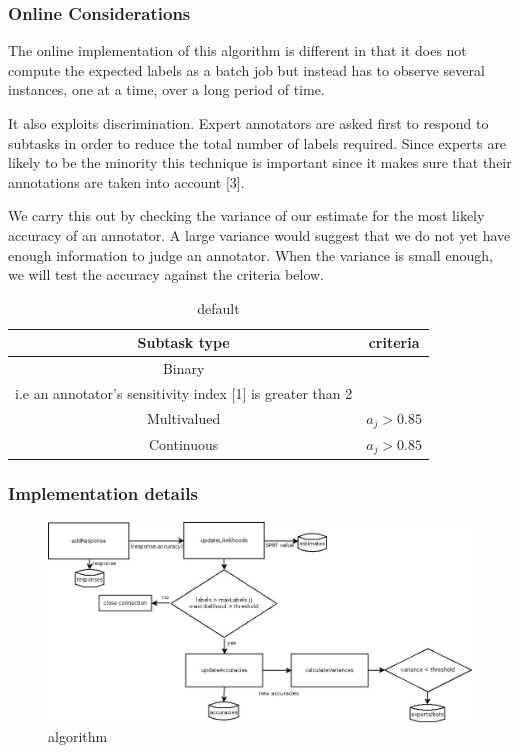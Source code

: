 \documentclass[11pt]{article}
\begin{document}
\subsubsection{Online Considerations}

The online implementation of this algorithm is different in that it does not compute the expected labels as a batch job but instead has to observe several instances, one at a time, over a long period of time.

It also exploits discrimination. Expert annotators are asked first to respond to subtasks in order to reduce the total number of labels required. Since experts are likely to be the minority this technique is important since it makes sure that their annotations are taken into account [3].

We carry this out by checking the variance of our estimate for the most likely accuracy of an annotator. A large variance would suggest that we do not yet have enough information to judge an annotator. When the variance is small enough, we will test the accuracy against the criteria below.\\

\begin{table}[htdp]
\caption{default}
\begin{center}
\begin{tabular}{|c|c|}
Subtask type & criteria\\ \hline
Binary & \shortstack{$\frac{\Phi^{-1}(a_{j}^{0}) - \Phi^{-1}(1 - a_{j}^{1})}{2} > 2$ \\ i.e an annotator's sensitivity index [1] is greater than 2}\\
Multivalued & $a_{j} > 0.85$\\ 
Continuous & $a_{j} > 0.85$\\
\end{tabular}
\end{center}
\label{default}
\end{table}%

\subsubsection{Implementation details}

\begin{figure}[htbp]
\begin{center}
\includegraphics[width=\linewidth]{flow.jpg}
\caption{algorithm}
\label{default}
\end{center}
\end{figure}
\end{document}
